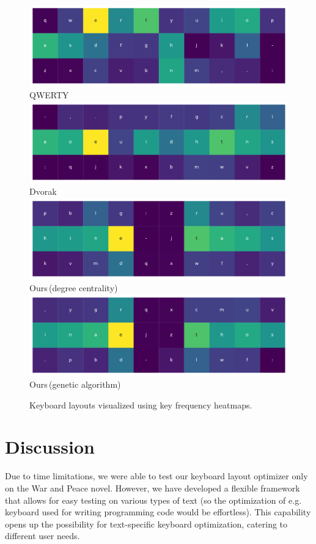 \documentclass[9pt,twocolumn,twoside]{pnas-report}
\begin{document}
\begin{figure}[t]\centering%
    \includegraphics[width=0.9\linewidth]{fig/qwerty}
    \small{QWERTY}
    \vskip8pt
    \includegraphics[width=0.9\linewidth]{fig/dvorak}
    \small{Dvorak}
    \vskip8pt
    \includegraphics[width=0.9\linewidth]{fig/centrality}
    \small{Ours\,(degree centrality)}
    \vskip8pt
    \includegraphics[width=0.9\linewidth]{fig/genetic}
    \small{Ours\,(genetic algorithm)}
    \caption{Keyboard layouts visualized using key frequency heatmaps.}
    \label{fig:layouts}
\end{figure}

\lipsum[4-6]

\section*{Discussion}

Due to time limitations, we were able to test our keyboard layout optimizer only on the War and Peace novel.
However, we have developed a flexible framework that allows for easy testing on various types of text (so the optimization of e.g. keyboard used for writing programming code would be effortless).
This capability opens up the possibility for text-specific keyboard optimization, catering to different user needs.
\end{document}
